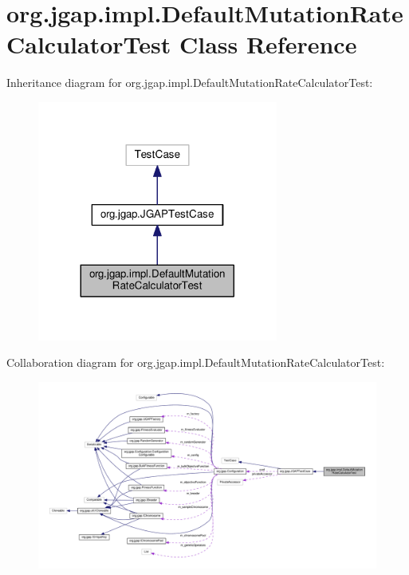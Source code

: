 \hypertarget{classorg_1_1jgap_1_1impl_1_1_default_mutation_rate_calculator_test}{\section{org.\-jgap.\-impl.\-Default\-Mutation\-Rate\-Calculator\-Test Class Reference}
\label{classorg_1_1jgap_1_1impl_1_1_default_mutation_rate_calculator_test}
}


Inheritance diagram for org.\-jgap.\-impl.\-Default\-Mutation\-Rate\-Calculator\-Test\-:
\nopagebreak
\begin{figure}[H]
\begin{center}
\leavevmode
\includegraphics[width=224pt]{classorg_1_1jgap_1_1impl_1_1_default_mutation_rate_calculator_test__inherit__graph}
\end{center}
\end{figure}


Collaboration diagram for org.\-jgap.\-impl.\-Default\-Mutation\-Rate\-Calculator\-Test\-:
\nopagebreak
\begin{figure}[H]
\begin{center}
\leavevmode
\includegraphics[width=350pt]{classorg_1_1jgap_1_1impl_1_1_default_mutation_rate_calculator_test__coll__graph}
\end{center}
\end{figure}
